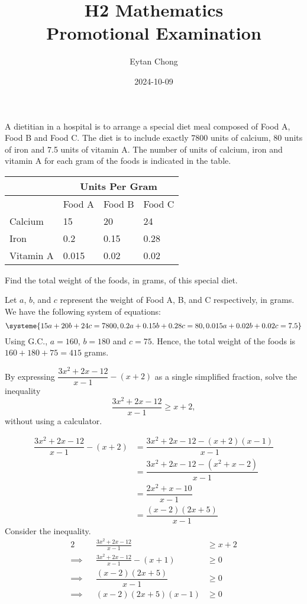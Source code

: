 \documentclass{echw}
\title{H2 Mathematics\\Promotional Examination}
\author{Eytan Chong}
\date{2024-10-09}
\begin{document}
    \problem{}
        A dietitian in a hospital is to arrange a special diet meal composed of Food A, Food B and Food C. The diet is to include exactly 7800 units of calcium, 80 units of iron and 7.5 units of vitamin A. The number of units of calcium, iron and vitamin A for each gram of the foods is indicated in the table.

        \begin{table}[H]
            \centering
            \begin{tabular}{|l|l|l|l|}
            \hline
             & \multicolumn{3}{|c|}{Units Per Gram} \\\hline
             & Food A & Food B & Food C \\\hline
             Calcium & 15 & 20 & 24 \\\hline
             Iron & 0.2 & 0.15 & 0.28 \\\hline
             Vitamin A & 0.015 & 0.02 & 0.02\\\hline
            \end{tabular}
        \end{table}

        Find the total weight of the foods, in grams, of this special diet.
        
    \solution
        Let $a$, $b$, and $c$ represent the weight of Food A, B, and C respectively, in grams. We have the following system of equations:
        \[\systeme{15a + 20b + 24c = 7800,0.2a+0.15b+0.28c=80,0.015a+0.02b+0.02c = 7.5}\]
        Using G.C., $a=160$, $b=180$ and $c=75$. Hence, the total weight of the foods is $160 + 180 + 75 = \boxed{415}$ grams.

    \problem{}
        By expressing $\dfrac{3x^2 + 2x - 12}{x-1} - (x+2)$ as a single simplified fraction, solve the inequality \[\frac{3x^2 + 2x - 12}{x-1} \geq x + 2,\] without using a calculator.

    \solution
        \begin{align*}
            \dfrac{3x^2+2x-12}{x-1} - (x+2) &= \dfrac{3x^2 + 2x - 12 - (x+2)(x-1)}{x-1}\\
            &= \dfrac{3x^2 + 2x - 12 - (x^2 + x - 2)}{x-1}\\
            &= \dfrac{2x^2 + x - 10}{x-1}\\
            &= \dfrac{(x-2)(2x+5)}{x-1}
        \end{align*}
        Consider the inequality.
        \begin{alignat*}{2}
            &&\frac{3x^2 + 2x - 12}{x-1} &\geq x + 2\\
            \implies&&\frac{3x^2 + 2x - 12}{x-1} - (x+1) &\geq 0\\
            \implies&&\dfrac{(x-2)(2x+5)}{x-1} &\geq 0\\
            \implies&&(x-2)(2x+5)(x-1) &\geq 0
        \end{alignat*}
\end{document}
